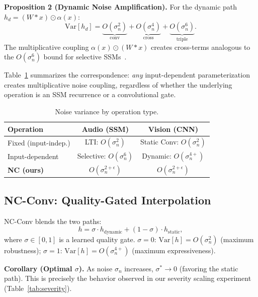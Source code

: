 \documentclass[runningheads]{llncs}
\begin{document}
\noindent\textbf{Proposition 2 (Dynamic Noise Amplification).}
For the dynamic path $h_d = (W * x) \odot \alpha(x)$:
\begin{equation}
\text{Var}[h_d] = \underbrace{O(\sigma_n^2)}_{\text{conv}} + \underbrace{O(\sigma_n^4)}_{\text{cross}} + \underbrace{O(\sigma_n^6)}_{\text{triple}}.
\label{eq:dynamic_var}
\end{equation}
The multiplicative coupling $\alpha(x) \odot (W{*}x)$ creates cross-terms analogous to the $O(\sigma_n^6)$ bound for selective SSMs~\cite{choi2026ncssm}.

Table~\ref{tab:noise_parallel} summarizes the correspondence: \emph{any} input-dependent parameterization creates multiplicative noise coupling, regardless of whether the underlying operation is an SSM recurrence or a convolutional gate.

\begin{table}[t]
\centering
\caption{Noise variance by operation type.}
\label{tab:noise_parallel}
\small
\begin{tabular}{@{}lcc@{}}
\toprule
\textbf{Operation} & \textbf{Audio (SSM)} & \textbf{Vision (CNN)} \\
\midrule
Fixed (input-indep.) & LTI: $O(\sigma_n^2)$ & Static Conv: $O(\sigma_n^2)$ \\
Input-dependent & Selective: $O(\sigma_n^6)$ & Dynamic: $O(\sigma_n^{4+})$ \\
\textbf{NC (ours)} & $O(\sigma_n^{2+\epsilon})$ & $O(\sigma_n^{2+\epsilon})$ \\
\bottomrule
\end{tabular}
\end{table}


\subsection{NC-Conv: Quality-Gated Interpolation}

NC-Conv blends the two paths:
\begin{equation}
h = \sigma \cdot h_{\text{dynamic}} + (1 - \sigma) \cdot h_{\text{static}},
\label{eq:nc_blend}
\end{equation}
where $\sigma \in [0,1]$ is a learned quality gate.
$\sigma = 0$: $\text{Var}[h] = O(\sigma_n^2)$ (maximum robustness);
$\sigma = 1$: $\text{Var}[h] = O(\sigma_n^{4+})$ (maximum expressiveness).

\noindent\textbf{Corollary (Optimal $\sigma$).}
As noise $\sigma_n$ increases, $\sigma^* \to 0$ (favoring the static path).
This is precisely the behavior observed in our severity scaling experiment (Table~\ref{tab:severity}).
\end{document}
